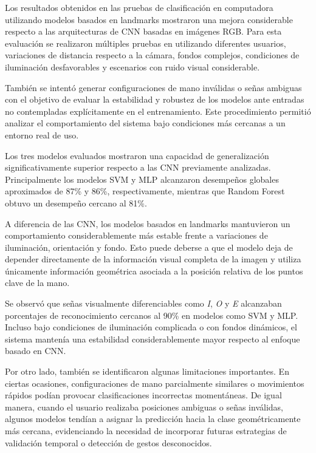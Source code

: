 	Los resultados obtenidos en las pruebas de clasificación en computadora utilizando modelos basados en landmarks mostraron una mejora considerable respecto a las arquitecturas de CNN basadas en imágenes RGB. Para esta evaluación se realizaron múltiples pruebas  en utilizando diferentes usuarios, variaciones de distancia respecto a la cámara, fondos complejos, condiciones de iluminación desfavorables y escenarios con ruido visual considerable.
	
	También se intentó generar configuraciones de mano inválidas o señas ambiguas con el objetivo de evaluar la estabilidad y robustez de los modelos ante entradas no contempladas explícitamente en el entrenamiento. Este procedimiento permitió analizar el comportamiento del sistema bajo condiciones más cercanas a un entorno real de uso.
	
	Los tres modelos evaluados mostraron una capacidad de generalización significativamente superior respecto a las CNN previamente analizadas. Principalmente los modelos SVM y MLP alcanzaron desempeños globales aproximados de 87\% y 86\%, respectivamente, mientras que Random Forest obtuvo un desempeño cercano al 81\%.
	
	A diferencia de las CNN, los modelos basados en landmarks mantuvieron un comportamiento considerablemente más estable frente a variaciones de iluminación, orientación y fondo. Esto puede deberse a que el modelo deja de depender directamente de la información visual completa de la imagen y utiliza únicamente información geométrica asociada a la posición relativa de los puntos clave de la mano.
	
	Se observó que señas visualmente diferenciables como \textit{I}, \textit{O} y \textit{E} alcanzaban porcentajes de reconocimiento cercanos al 90\% en modelos como SVM y MLP. Incluso bajo condiciones de iluminación complicada o con fondos dinámicos, el sistema mantenía una estabilidad considerablemente mayor respecto al enfoque basado en CNN.
	
	Por otro lado, también se identificaron algunas limitaciones importantes. En ciertas ocasiones, configuraciones de mano parcialmente similares o movimientos rápidos podían provocar clasificaciones incorrectas momentáneas. De igual manera, cuando el usuario realizaba posiciones ambiguas o señas inválidas, algunos modelos tendían a asignar la predicción hacia la clase geométricamente más cercana, evidenciando la necesidad de incorporar futuras estrategias de validación temporal o detección de gestos desconocidos.
	

